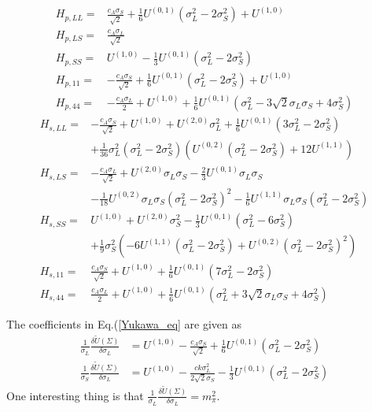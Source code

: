 \documentclass[12pt]{article}
\begin{document}
\begin{align}
H_{p,LL}=&\frac{c_A \sigma_S}{\sqrt{2}}+\frac{1}{6} U^{(0,1)} (\sigma_L^2-2 \sigma_S^2)+U^{(1,0)}\\
H_{p,LS}=&\frac{c_A \sigma_L}{\sqrt{2}}\\
H_{p,SS}=&U^{(1,0)} - \frac{1}{3} U^{(0,1)} (\sigma_L^2 - 2 \sigma_S^2)\\
H_{p,11}=&-\frac{c_A \sigma_S}{\sqrt{2}}+\frac{1}{6} U^{(0,1)} (\sigma _L^2-2\sigma_S^2)+U^{(1,0)}\\
H_{p,44}=&- \frac{c_A \sigma_L}{2} + U^{(1,0)} +
 \frac{1}{6} U^{(0,1)}(\sigma_L^2- 3 \sqrt{2} \sigma_L \sigma_S+4 \sigma_S^2)
\end{align}
\begin{align}
H_{s,LL}=&-\frac{c_A \sigma_S}{\sqrt{2}}+U^{(1,0)}+U^{(2,0)} \sigma_L^2 + \frac{1}{6} U^{(0,1)} (3 \sigma_L^2-2 \sigma_S^2)\\ \nonumber
&+\frac{1}{36} \sigma_L^2 (\sigma_L^2-2 \sigma_S^2)(U^{(0,2)} (\sigma_L^2-2\sigma_S^2)+12 U^{(1,1)})\\
H_{s,LS}=&-\frac{c_A \sigma_L}{\sqrt{2}}+U^{(2,0)} \sigma_L \sigma_S-\frac{2}{3} U^{(0,1)} \sigma_L \sigma_S \\ \nonumber
&-\frac{1}{18} U^{(0,2)} \sigma_L \sigma_S (\sigma_L^2-2 \sigma_S^2)^2-\frac{1}{6} U^{(1,1)}\sigma_L \sigma_S (\sigma_L^2-2 \sigma_S^2)\\
H_{s,SS}=&U^{(1,0)}+U^{(2,0)}\sigma_S^2 - \frac{1}{3} U^{(0,1)} (\sigma_L^2 - 6 \sigma_S^2) \\ \nonumber
&+\frac{1}{9} \sigma_S^2 (- 6 U^{(1,1)} (\sigma_L^2 - 2 \sigma_S^2) +
    U^{(0,2)} (\sigma_L^2 - 2 \sigma_S^2)^2)\\
H_{s,11}=&\frac{c_A \sigma_S}{\sqrt{2}}+U^{(1,0)} + \frac{1}{6} U^{(0,1)}(7 \sigma_L^2 - 2 \sigma_S^2)\\
H_{s,44}=&\frac{c_A \sigma_L}{2}+U^{(1,0)}+\frac{1}{6} U^{(0,1)} (\sigma_L^2+3 \sqrt{2} \sigma_L\sigma_S+4 \sigma_S^2)
\end{align}

The coefficients in Eq.(\ref{Yukawa_eq} are given as
\begin{align}
\frac{1}{\sigma_L} \frac{\delta \tilde U(\Sigma)}{\delta \sigma_L}&=
U^{(1,0)} - \frac{c_A \sigma_S}{\sqrt{2}} + \frac{1}{6}U^{(0,1)} (\sigma_L^2 - 2 \sigma_S^2)\\
\frac{1}{\sigma_S} \frac{\delta \tilde U(\Sigma)}{\delta \sigma_L}&=
U^{(1,0)}- \frac{ck \sigma_L^2}{2 \sqrt{2} \sigma_S} - \frac{1}{3} U^{(0,1)} (\sigma_L^2 - 2 \sigma_S^2)
\end{align}
One interesting thing is that  $\frac{1}{\sigma_L} \frac{\delta \tilde U(\Sigma)}{\delta \sigma_L}=m_\pi^2$.
\end{document}
